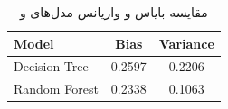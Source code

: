 \documentclass[11pt]{article}
\begin{document}
				\begin{table}[h!]
		\caption{مقایسه بایاس و واریانس مدل‌های  و }
		\begin{latin}
			\centering
			\begin{tabular}{|l|c|c|}
				\hline
				\textbf{Model} & \textbf{Bias} & \textbf{Variance} \\ \hline
				Decision Tree & 0.2597 & 0.2206 \\ \hline
				Random Forest & 0.2338 & 0.1063 \\ \hline
			\end{tabular}
		\end{latin}
		\label{tab:results3} 
	\end{table}
	
\end{document}
